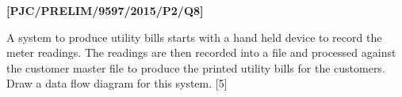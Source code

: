 \item \textbf{{[}PJC/PRELIM/9597/2015/P2/Q8{]} }

A system to produce utility bills starts with a hand held device to
record the meter readings. The readings are then recorded into a file
and processed against the customer master file to produce the printed
utility bills for the customers. Draw a data flow diagram for this
system. \hfill{}{[}5{]}